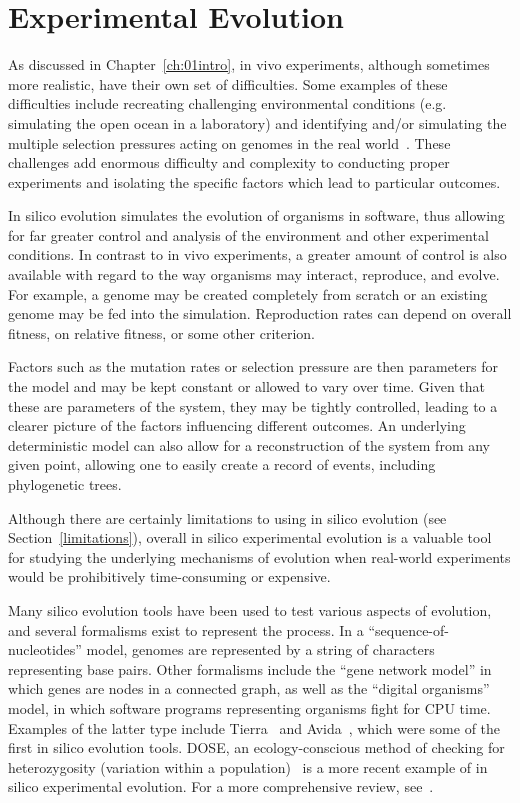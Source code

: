 \section{Experimental Evolution}
As discussed in Chapter~\ref{ch:01intro}, in vivo experiments, although sometimes more realistic, have their own set of difficulties. Some examples of these difficulties include recreating challenging environmental conditions (e.g. simulating the open ocean in a laboratory) and identifying and/or simulating the multiple selection pressures acting on genomes in the real world~\cite{Batut.2013}. These challenges add enormous difficulty and complexity to conducting proper experiments and isolating the specific factors which lead to particular outcomes. 

In silico evolution simulates the evolution of organisms in software, thus allowing for far greater control and analysis of the environment and other experimental conditions. In contrast to in vivo experiments, a greater amount of control is also available with regard to the way organisms may interact, reproduce, and evolve. For example, a genome may be created completely from scratch or an existing genome may be fed into the simulation. Reproduction rates can depend on overall fitness, on relative fitness, or some other criterion. 

Factors such as the mutation rates or selection pressure are then parameters for the model and may be kept constant or allowed to vary over time. Given that these are parameters of the system, they may be tightly controlled, leading to a clearer picture of the factors influencing different outcomes. An underlying deterministic model can also allow for a reconstruction of the system from any given point, allowing one to easily create a record of events, including phylogenetic trees. 

Although there are certainly limitations to using in silico evolution (see Section~\ref{limitations}), overall in silico experimental evolution is a valuable tool for studying the underlying mechanisms of evolution when real-world experiments would be prohibitively time-consuming or expensive.

Many silico evolution tools have been used to test various aspects of evolution, and several formalisms exist to represent the process. In a ``sequence-of-nucleotides'' model, genomes are represented by a string of characters representing base pairs. Other formalisms include the ``gene network model'' in which genes are nodes in a connected graph, as well as the ``digital organisms'' model, in which software programs representing organisms fight for CPU time. Examples of the latter type include Tierra~\cite{Tierra-Ray} and Avida~\cite{Avida-Ofria}, which were some of the first in silico evolution tools. DOSE, an ecology-conscious method of checking for heterozygosity (variation within a population)~\cite{Castillo-DOSE} is a more recent example of in silico experimental evolution. For a more comprehensive review, see~\cite{Mozhayskiy-In-Silico-Review}. 
 
